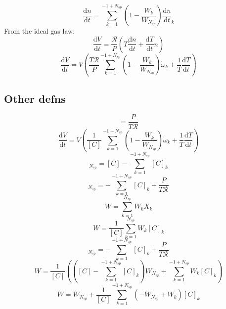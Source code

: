 \documentclass[a4paper,10pt]{article}
\newcommand{\ns}{N_{sp}}
\newcommand{\Ru}{\mathcal{R}}
\begin{document}
\begin{dmath} \frac{\text{d} n }{\text{d} t } = \sum_{k=1}^{-1 + \ns} \left(1 - \frac{W_{k}}{W_{\ns}}\right) \frac{\text{d} n }{\text{d} t }_{k}\end{dmath} 
From the ideal gas law:
\begin{dmath} \frac{\text{d} V }{\text{d} t } = \frac{\Ru}{P} \left(T \frac{\text{d} n }{\text{d} t } + \frac{\text{d} T }{\text{d} t } n\right)\end{dmath} 
\begin{dmath} \frac{\text{d} V }{\text{d} t } = V \left(\frac{T \Ru}{P} \sum_{k=1}^{-1 + \ns} \left(1 - \frac{W_{k}}{W_{\ns}}\right) \dot{\omega}_{k} + \frac{1}{T} \frac{\text{d} T }{\text{d} t }\right)\end{dmath} 
\subsection{Other defns}
\begin{dmath} [C] = \frac{P}{T \Ru}\end{dmath} 
\begin{dmath} \frac{\text{d} V }{\text{d} t } = V \left(\frac{1}{[C]} \sum_{k=1}^{-1 + \ns} \left(1 - \frac{W_{k}}{W_{\ns}}\right) \dot{\omega}_{k} + \frac{1}{T} \frac{\text{d} T }{\text{d} t }\right)\end{dmath} 
\begin{dmath} [C]_{\ns} = [C] - \sum_{k=1}^{-1 + \ns} [C]_{k}\end{dmath} 
\begin{dmath} [C]_{\ns} = - \sum_{k=1}^{-1 + \ns} [C]_{k} + \frac{P}{T \Ru}\end{dmath} 
\begin{dmath} W = \sum_{k=1}^{\ns} W_{k} X_{k}\end{dmath} 
\begin{dmath} W = \frac{1}{[C]} \sum_{k=1}^{\ns} W_{k} [C]_{k}\end{dmath} 
\begin{dmath} [C]_{\ns} = - \sum_{k=1}^{-1 + \ns} [C]_{k} + \frac{P}{T \Ru}\end{dmath} 
\begin{dmath} W = \frac{1}{[C]} \left(\left([C] - \sum_{k=1}^{-1 + \ns} [C]_{k}\right) W_{\ns} + \sum_{k=1}^{-1 + \ns} W_{k} [C]_{k}\right)\end{dmath} 
\begin{dmath} W = W_{\ns} + \frac{1}{[C]} \sum_{k=1}^{-1 + \ns} \left(- W_{\ns} + W_{k}\right) [C]_{k}\end{dmath} 
\end{document}

